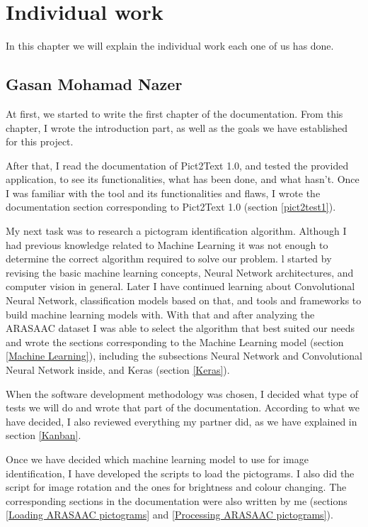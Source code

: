 
\chapter{Individual work}
\label{Individual work}

In this chapter we will explain the individual work each one of us has done.

\section{Gasan Mohamad Nazer}

At first, we started to write the first chapter of the documentation. From this chapter, I wrote the introduction part, as well as the goals we have established for this project. 

After that,  I read the documentation of Pict2Text 1.0, and tested the provided application, to see its functionalities, what has been done, and what hasn't. Once I was familiar with the tool and its functionalities and flaws, I wrote the documentation section corresponding to Pict2Text 1.0 (section \ref{pict2test1}).

My next task was to research a pictogram identification algorithm. Although I had previous knowledge related to Machine Learning it was not enough to determine the correct algorithm required to solve our problem. l started by revising the basic machine learning concepts, Neural Network architectures, and computer vision in general. Later I have continued learning about Convolutional Neural Network, classification models based on that, and tools and frameworks to build machine learning models with. With that and after analyzing the ARASAAC dataset I was able to select the algorithm that best suited our needs and wrote the sections corresponding to the Machine Learning model (section \ref{Machine Learning}), including the subsections Neural Network and Convolutional Neural Network inside, and Keras (section \ref{Keras}).

When the software development methodology was chosen, I decided what type of tests we will do and wrote that part of the documentation. According to what we have decided, I also reviewed everything my partner did, as we have explained in section \ref{Kanban}.

Once we have decided which machine learning model to use for image identification, I have developed the scripts to load the pictograms. I also did the script for image rotation and the ones for brightness and colour changing. The corresponding sections in the documentation were also written by me (sections \ref{Loading ARASAAC pictograms} and \ref{Processing ARASAAC pictograms}).

